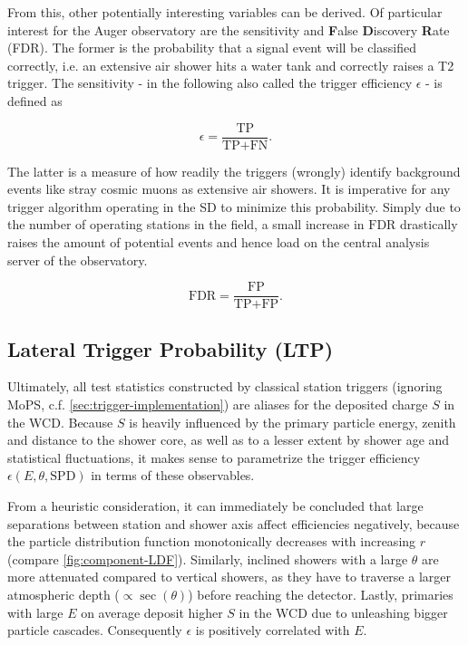 From this, other potentially interesting variables can be derived. Of particular interest for the Auger observatory are the sensitivity and \textbf{F}alse 
\textbf{D}iscovery \textbf{R}ate (FDR). The former is the probability that a signal event will be classified correctly, i.e. an extensive air shower hits a 
water tank and correctly raises a T2 trigger. The sensitivity - in the following also called the trigger efficiency $\epsilon$ - is defined as

\begin{equation}
	\label{eq:statistics-efficiency}
	\epsilon = \frac{\text{TP}}{\text{TP} + \text{FN}}.
\end{equation}

The latter is a measure of how readily the triggers (wrongly) identify background events like stray cosmic muons as extensive air showers. It is imperative 
for any trigger algorithm operating in the SD to minimize this probability. Simply due to the number of operating stations in the field, a small increase in 
$\text{FDR}$ drastically raises the amount of potential events and hence load on the central analysis server of the observatory.

\begin{equation}
	\label{eq:statistics-efficiency}
	\text{FDR} = \frac{\text{FP}}{\text{TP} + \text{FP}}.
\end{equation}

\subsection{Lateral Trigger Probability (LTP)}
\label{ssec:lateral-trigger-probability}

Ultimately, all test statistics constructed by classical station triggers (ignoring MoPS, c.f. \autoref{sec:trigger-implementation}) are aliases for the deposited 
charge $S$ in the WCD. Because $S$ is heavily influenced by the primary particle energy, zenith and distance to the shower core, as well as to a lesser extent by 
shower age and statistical fluctuations, it makes sense to parametrize the trigger efficiency $\epsilon(E, \theta, \text{SPD})$ in terms of these observables. 

From a heuristic consideration, it can immediately be concluded that large separations between station and shower axis affect efficiencies negatively, because the 
particle distribution function monotonically decreases with increasing $r$ (compare \autoref{fig:component-LDF}). Similarly, inclined showers with a large $\theta$
are more attenuated compared to vertical showers, as they have to traverse a larger atmospheric depth ($\propto\sec\left(\theta\right)$) before reaching the 
detector. Lastly, primaries with large $E$ on average deposit higher $S$ in the WCD due to unleashing bigger particle cascades. Consequently $\epsilon$ is 
positively correlated with $E$.

